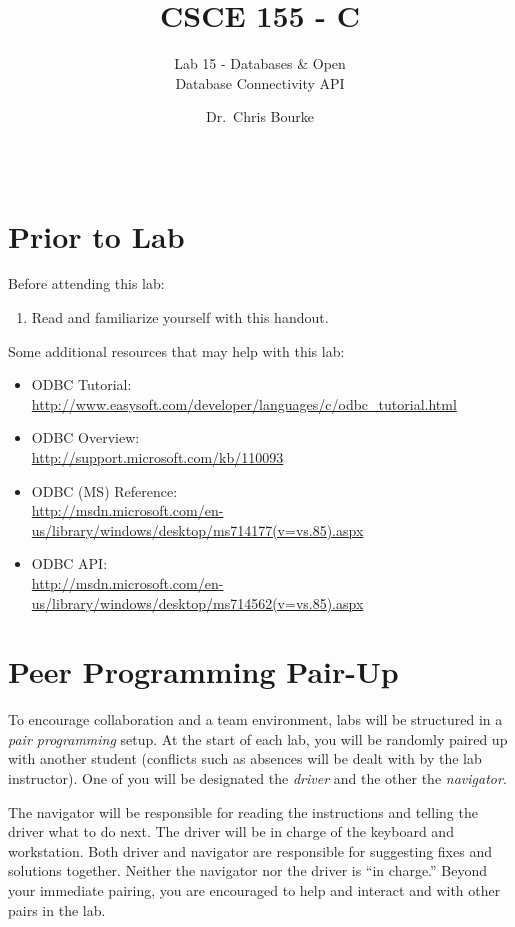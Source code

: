 \documentclass[12pt]{scrartcl}
\title{CSCE 155 - C}
\subtitle{Lab 15 - Databases \& Open \\Database Connectivity API}
\author{Dr.\ Chris Bourke}
\date{~}
\begin{document}
\maketitle

\section*{Prior to Lab}

Before attending this lab:
\begin{enumerate}
  \item Read and familiarize yourself with this handout.
\end{enumerate}

Some additional resources that may help with this lab:
\begin{itemize}
  \item ODBC Tutorial: \\
  	\url{http://www.easysoft.com/developer/languages/c/odbc_tutorial.html}
  \item ODBC Overview:  \\
  	\url{http://support.microsoft.com/kb/110093}
  \item ODBC (MS) Reference: \\
  	\url{http://msdn.microsoft.com/en-us/library/windows/desktop/ms714177(v=vs.85).aspx}
  \item ODBC API: \\
  	\url{http://msdn.microsoft.com/en-us/library/windows/desktop/ms714562(v=vs.85).aspx}
\end{itemize}

\section*{Peer Programming Pair-Up}

To encourage collaboration and a team environment, labs will be
structured in a \emph{pair programming} setup.  At the start of
each lab, you will be randomly paired up with another student 
(conflicts such as absences will be dealt with by the lab instructor).
One of you will be designated the \emph{driver} and the other
the \emph{navigator}.  

The navigator will be responsible for reading the instructions and
telling the driver what to do next.  The driver will be in charge of the
keyboard and workstation.  Both driver and navigator are responsible
for suggesting fixes and solutions together.  Neither the navigator
nor the driver is ``in charge.''  Beyond your immediate pairing, you
are encouraged to help and interact and with other pairs in the lab.
\end{document}
